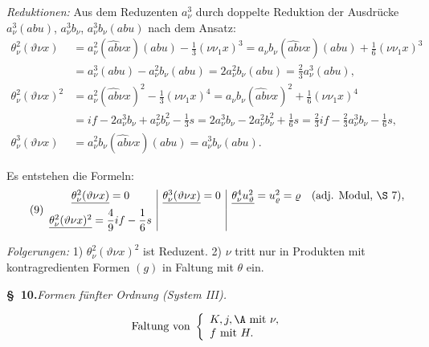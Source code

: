 \noindent\emph{Reduktionen:} Aus dem Reduzenten $a_\nu^3$ durch doppelte Reduktion der Ausdrücke
$a_\nu^3(abu)$, $a_\nu^3b_\nu$, $a_\nu^3b_\nu(abu)$ nach dem Ansatz:
\[
\begin{aligned}
\theta_\nu^2(\vartheta\nu x)
&=a_\nu^2(\widehat{ab}\nu x)(abu)-\frac13(\nu\nu_1x)^3
=a_\nu b_\nu(\widehat{ab}\nu x)(abu)+\frac16(\nu\nu_1x)^3\\
&=a_\nu^3(abu)-a_\nu^2b_\nu(abu)=2a_\nu^2b_\nu(abu)=\frac23a_\nu^3(abu),\\[.4em]
\theta_\nu^2(\vartheta\nu x)^2
&=a_\nu^2(\widehat{ab}\nu x)^2-\frac13(\nu\nu_1x)^4
=a_\nu b_\nu(\widehat{ab}\nu x)^2+\frac16(\nu\nu_1x)^4\\
&=i f-2a_\nu^3b_\nu+a_\nu^2b_\nu^2-\frac13s
=2a_\nu^3b_\nu-2a_\nu^2b_\nu^2+\frac16s
=\frac23i f-\frac23a_\nu^3b_\nu-\frac16s,\\[.4em]
\theta_\nu^3(\vartheta\nu x)&=a_\nu^2b_\nu(\widehat{ab}\nu x)(abu)=a_\nu^3b_\nu(abu).
\end{aligned}
\]

Es entstehen die Formeln:
\[
\tag{9}
\begin{array}{c|c|c}
\underline{\theta_\nu^2(\vartheta\nu x)}=0
&\underline{\theta_\nu^3(\vartheta\nu x)}=0
&\underline{\theta_\nu^4u_\vartheta^2}=u_\varrho^2=\varrho\quad(\text{adj. Modul, \S\ 7}),\\[0.6em]
\underline{\theta_\nu^2(\vartheta\nu x)^2}=\dfrac49 i f-\dfrac16s
&&
\end{array}
\]

\noindent\emph{Folgerungen:} 1) $\theta_\nu^2(\vartheta\nu x)^2$ ist Reduzent.
2) $\nu$ tritt nur in Produkten mit kontragredienten Formen $(g)$ in Faltung mit $\theta$ ein.

\begin{center}
\textbf{\S\ 10.}\quad\emph{Formen fünfter Ordnung (System III).}
\end{center}

\[
\text{Faltung von }\left\{\begin{array}{l}
K,j,\A \text{ mit }\nu,\\
f\text{ mit }H.
\end{array}\right.
\]

